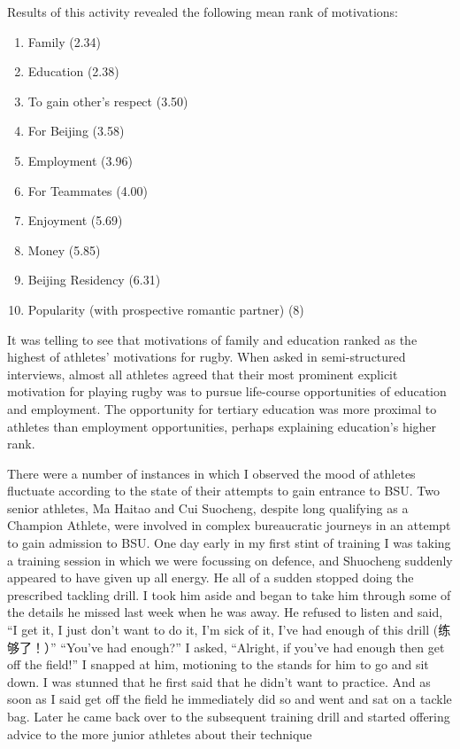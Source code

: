   Results of this activity revealed the following mean rank of motivations:

  \begin{enumerate}
    \item Family (2.34)
    \item Education (2.38)
    \item To gain other's respect (3.50)
    \item For Beijing (3.58)
    \item Employment (3.96)
    \item For Teammates (4.00)
    \item Enjoyment (5.69)
    \item Money (5.85)
    \item Beijing Residency (6.31)
    \item Popularity (with prospective romantic partner) (8)
  \end{enumerate}

  It was telling to see that motivations of family and education ranked as the highest of athletes' motivations for rugby.  When asked in semi-structured interviews, almost all athletes agreed that their most prominent explicit motivation for playing rugby was to pursue life-course opportunities of education and employment. The opportunity for tertiary education was more proximal to athletes than employment opportunities, perhaps explaining education's higher rank.



  There were a number of instances in which I observed the mood of athletes fluctuate according to the state of their attempts to gain entrance to BSU.  Two senior athletes, Ma Haitao and Cui Suocheng, despite long qualifying as a Champion Athlete, were involved in complex bureaucratic journeys in an attempt to gain admission to BSU.  One day early in my first stint of training I was taking a training session in which we were focussing on defence, and Shuocheng suddenly appeared to have given up all energy.  He all of a sudden stopped doing the prescribed tackling drill.  I took him aside and began to take him through some of the details he missed last week when he was away.  He refused to listen and said, “I get it, I just don’t want to do it, I’m sick of it, I’ve had enough of this drill (练够了！）”  “You’ve had enough?” I asked, “Alright, if you’ve had enough then get off the field!”  I snapped at him, motioning to the stands for him to go and sit down. I was stunned that he first said that he didn’t want to practice.  And as soon as I said get off the field he immediately did so and went and sat on a tackle bag.  Later he came back over to the subsequent training drill and started offering advice to the more junior athletes about their technique

